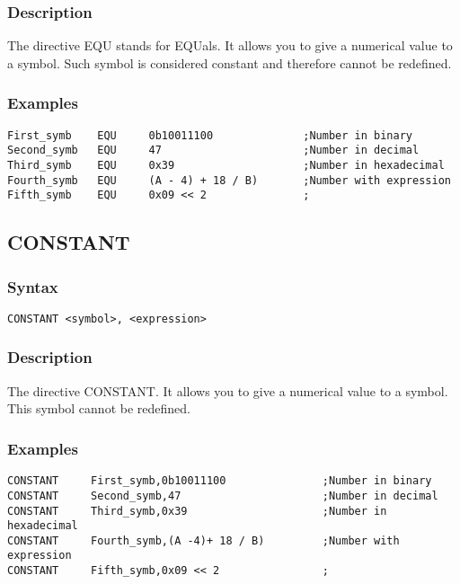         \subsubsection{Description}
            The directive EQU stands for EQUals. It allows you to give a numerical value to a symbol. Such symbol is considered constant and therefore cannot be redefined.

        \subsubsection{Examples}
            \verb'First_symb    EQU     0b10011100              ;Number in binary'\\
            \verb'Second_symb   EQU     47                      ;Number in decimal'\\
            \verb'Third_symb    EQU     0x39                    ;Number in hexadecimal'\\
            \verb'Fourth_symb   EQU     (A - 4) + 18 / B)       ;Number with expression'\\
            \verb'Fifth_symb    EQU     0x09 << 2               ;'

    \subsection{CONSTANT}
        \subsubsection{Syntax}
            \verb'CONSTANT <symbol>, <expression>'

        \subsubsection{Description}
            The directive CONSTANT. It allows you to give a numerical value to a symbol. This symbol cannot be redefined.

        \subsubsection{Examples}
            \verb'CONSTANT     First_symb,0b10011100               ;Number in binary'\\
            \verb'CONSTANT     Second_symb,47                      ;Number in decimal'\\
            \verb'CONSTANT     Third_symb,0x39                     ;Number in hexadecimal'\\
            \verb'CONSTANT     Fourth_symb,(A -4)+ 18 / B)         ;Number with expression'\\
            \verb'CONSTANT     Fifth_symb,0x09 << 2                ;'

